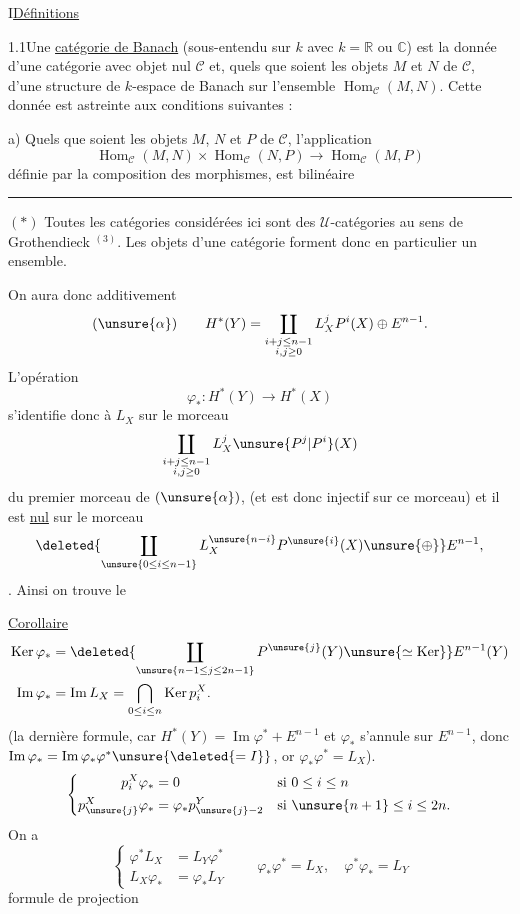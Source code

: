 I\qquad \uline{Définitions}

1.1\quad Une \uline{catégorie de Banach} (sous-entendu sur $k$ avec $k=\mathbb R$ ou $\mathbb C$) est la donnée d'une catégorie avec objet nul $\mathcal C$ et, quels que soient les objets $M$ et $N$ de $\mathcal C$, d'une structure de $k$-espace de Banach sur l'ensemble $\operatorname{Hom}_{\mathcal C}(M,N)$. Cette donnée est astreinte aux conditions suivantes :

a) Quels que soient les objets $M$, $N$ et $P$ de $\mathcal C$, l'application
\[
\operatorname{Hom}_{\mathcal C}(M,N)\times\operatorname{Hom}_{\mathcal C}(N,P)\longrightarrow\operatorname{Hom}_{\mathcal C}(M,P)
\]
définie par la composition des morphismes, est bilinéaire

\noindent\rule{\linewidth}{.4pt}

$(*)$ Toutes les catégories considérées ici sont des $\mathcal U$-catégories au sens de Grothendieck $^{(3)}$. Les objets d'une catégorie forment donc en particulier un ensemble.

On aura donc additivement
\[
(\unsure{\alpha})\qquad H^*(Y)=\coprod_{\substack{i+j\leq n-1\\i,j\geq0}}L_X^jP^i(X)\oplus E^{n-1}.
\]
L'opération
\[\varphi_*:H^*(Y)\longrightarrow H^*(X)\]
s'identifie donc à $L_X$ sur le morceau
\[\coprod_{\substack{i+j\leq n-1\\i,j\geq0}}L_X^j\unsure{P^j|P^i}(X)\]
du premier morceau de $(\unsure{\alpha})$, (et est  donc injectif sur ce morceau) et il est \uline{nul} sur le morceau
\[
\deleted{\coprod_{\unsure{0\leq i\leq n-1}}L_X^{\unsure{n-i}}P^{\unsure{i}}(X)\unsure{\oplus}}E^{n-1},
\]
. Ainsi on trouve le

\uline{Corollaire}
\[
\begin{aligned}
\operatorname{Ker}\varphi_*&=\deleted{\coprod_{\unsure{n-1\leq j\leq2n-1}}P^{\unsure{j}}(Y)\unsure{\simeq\operatorname{Ker}}}E^{n-1}(Y)\\
\operatorname{Im}\varphi_*&=\operatorname{Im}L_X=\bigcap_{0\leq i\leq n}\operatorname{Ker}p_i^X.
\end{aligned}
\]
(la dernière formule, car $H^*(Y)=\operatorname{Im}\varphi^*+E^{n-1}$ et $\varphi_*$ s'annule sur $E^{n-1}$, donc $\operatorname{Im}\varphi_*=\operatorname{Im}\varphi_*\varphi^*\unsure{\deleted{=I}}$, or $\varphi_*\varphi^*=L_X$).
\[
\left\{\begin{aligned}
p_i^X\varphi_*&=0 &&\text{si }0\leq i\leq n\\
p_{\unsure{j}}^X\varphi_*&=\varphi_*p_{\unsure{j}-2}^Y &&\text{si }\unsure{n+1}\leq i\leq2n.
\end{aligned}\right.
\]
On a
\[
\left\{\begin{aligned}
\varphi^*L_X&=L_Y\varphi^*\\
L_X\varphi_*&=\varphi_*L_Y
\end{aligned}\right.
\qquad
\varphi_*\varphi^*=L_X,\quad\varphi^*\varphi_*=L_Y
\]
formule de projection

